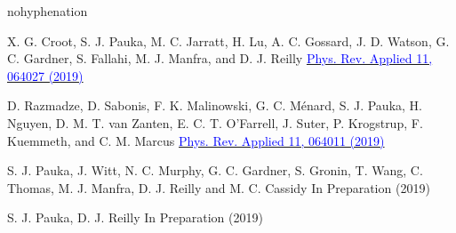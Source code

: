 \begin{hyphenrules}{nohyphenation}
\begin{sloppypar}
      {X. G. Croot, S. J. Pauka, M. C. Jarratt, H. Lu, A. C. Gossard, J. D. Watson, G. C. Gardner, S. Fallahi, M. J. Manfra, and D. J. Reilly}
      {\href{https://doi.org/\detokenize{10.1103/PhysRevApplied.11.064027}}{\textcolor{blue}{Phys. Rev. Applied 11, 064027 (2019)}}}

      {D. Razmadze, D. Sabonis, F. K. Malinowski, G. C. Ménard, S. J. Pauka, H. Nguyen, D. M. T. van Zanten, E. C. T. O'Farrell, J. Suter, P. Krogstrup, F. Kuemmeth, and C. M. Marcus}
      {\href{https://doi.org/\detokenize{10.1103/PhysRevApplied.11.064011}}{\textcolor{blue}{Phys. Rev. Applied 11, 064011 (2019)}}}

      {S. J. Pauka, J. Witt, N. C. Murphy, G. C. Gardner, S. Gronin, T. Wang, C. Thomas, M. J. Manfra, D. J. Reilly and M. C. Cassidy}
      {In Preparation (2019)}

      {S. J. Pauka, D. J. Reilly}
      {In Preparation (2019)}

      \makeatletter
      \let\parskip=\old@parskip
      \makeatother
  \end{sloppypar}
\end{hyphenrules}
\newpage\null\newpage

\makeatletter
\let\chapter\old@chapter
\let\@makeschapterhead\old@makeschapterhead
\makeatother